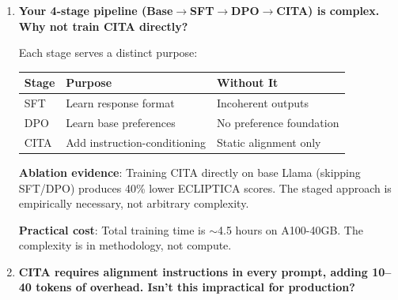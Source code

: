 \begin{enumerate}[label=\textbf{Q\arabic*.}, leftmargin=*, itemsep=8pt]
\begin{enumerate}[leftmargin=*,itemsep=2pt]
    \item \textbf{Dynamic alignment paradigm}: DPO produces one fixed policy. CITA produces a policy that \textit{adapts at inference time}. This enables deployment scenarios impossible with DPO.

    \item \textbf{ECLIPTICA benchmark}: First benchmark designed to isolate instruction effects from prompt effects.
\end{enumerate}

``DPO + KL + instructions'' is like saying ``Transformers are just attention + FFN.'' The combination creates emergent capabilities.

\vspace{4mm}

\item \textbf{Your 4-stage pipeline (Base$\rightarrow$SFT$\rightarrow$DPO$\rightarrow$CITA) is complex. Why not train CITA directly?}

 Each stage serves a distinct purpose:

\begin{table}[ht!]
\centering
\small
\renewcommand{\arraystretch}{1.2}
\begin{tabular}{@{}lll@{}}
\toprule
\textbf{Stage} & \textbf{Purpose} & \textbf{Without It} \\
\midrule
SFT & Learn response format & Incoherent outputs \\ \hline
DPO & Learn base preferences & No preference foundation \\ \hline
CITA & Add instruction-conditioning & Static alignment only \\
\bottomrule
\end{tabular}
\end{table}

\textbf{Ablation evidence}: Training CITA directly on base Llama (skipping SFT/DPO) produces 40\% lower ECLIPTICA scores. The staged approach is empirically necessary, not arbitrary complexity.

\textbf{Practical cost}: Total training time is $\sim$4.5 hours on A100-40GB. The complexity is in methodology, not compute.

\vspace{4mm}

\item \textbf{CITA requires alignment instructions in every prompt, adding 10--40 tokens of overhead. Isn't this impractical for production?}


\end{enumerate}
